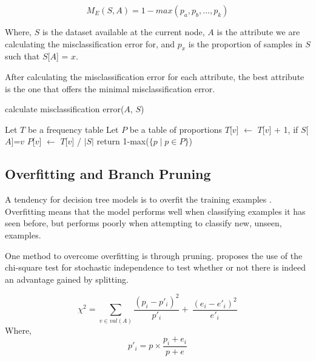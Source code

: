 \documentclass{IEEEtran}
\begin{document}
\begin{equation}
\label{misclassification-error-equation}
M_E(S,A) = 1 - max(p_a, p_b, ..., p_k) 
\end{equation}

Where, $S$ is the dataset available at the current node, $A$ is the
attribute we are calculating the misclassification error for, and $p_x$
is the proportion of samples in $S$ such that $S$[$A$] = $x$.

After calculating the misclassification error for each attribute, the
best attribute is the one that offers the minimal misclassification
error.

\begin{algorithm}
\caption{calculate misclassification error($A$, $S$)}
\begin{algorithmic}
\Statex {}
\State Let $T$ be a frequency table
\State Let $P$ be a table of proportions
    \State $T$[$v$] $\leftarrow$ $T$[$v$] + 1, if $S$[$A$]=$v$
  \EndFor
  \State $P$[$v$] $\leftarrow$ $T$[$v$] / $\lvert S \rvert$
\EndFor
\State return 1-max($\lbrace p \mid p \in P\rbrace$)

\end{algorithmic}
\end{algorithm}

\subsection{Overfitting and Branch Pruning}
A tendency for decision tree models is to overfit the training
examples \parencite{mitchell1997machine}. Overfitting means that the
model performs well when classifying examples it has seen before, but
performs poorly when attempting to classify new, unseen, examples.

One method to overcome overfitting is through
pruning. \parencite{quinlan1986induction} proposes the use of the
chi-square test for stochastic independence to test whether or not
there is indeed an advantage gained by splitting.

\begin{equation}
\label{chi-square-equation}
\chi^2 = \sum_{v\in val(A)}\frac{(p_i-p'_i)^2}{p'_i} + \
\frac{(e_i-e'_i)^2}{e'_i}
\end{equation}
Where,
\begin{equation}
\label{chi-square-helper-equation}
p'_i = p \times \frac{p_i+e_i}{p+e}
\end{equation}
\end{document}
